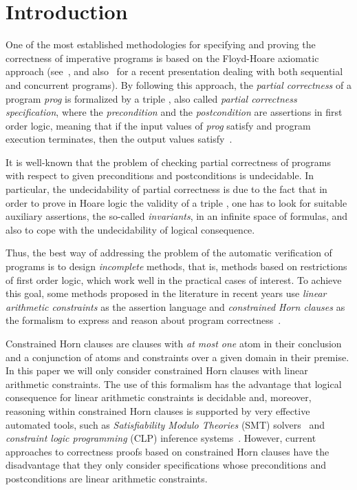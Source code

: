 \documentclass[english]{tlp}
\begin{document}
\section{Introduction}
\label{sec:intro}

One of the most established methodologies for specifying
and proving the correctness of imperative programs is based on the 
Floyd-Hoare axiomatic approach
(see~\cite{Hoa69}, and also~\cite{Ap&09} for a recent presentation dealing with 
both sequential and concurrent programs). 
By following this approach, the {\it partial correctness} of a program 
\textit{prog} is formalized by a triple
, also called {\it partial 
correctness specification}, 
where the {\it precondition}  and the
{\it postcondition}  are assertions in
first order logic, meaning that
if the input values of \textit{prog} satisfy 
and program execution terminates, then the output values satisfy~.

It is well-known that the problem of checking
partial correctness of programs with respect to given 
preconditions and postconditions
is undecidable. 
In particular, the undecidability of partial correctness is due to the fact
that in order to prove in Hoare logic the validity of a 
triple , 
one has to look for suitable auxiliary assertions, 
the so-called {\it invariants}, in an infinite space of formulas, and also
to cope with the undecidability of logical consequence.

Thus, the best way of addressing the problem of the automatic verification of
programs is to design {\it incomplete} methods, that is, methods
based on restrictions of first order logic, which work well in the practical cases of interest.
To achieve this goal, some methods proposed in the literature
in recent years use 
{\it linear arithmetic constraints} as the assertion language and {\it constrained 
Horn clauses} as the formalism to express and reason about program 
correctness~\cite{Bj&12,De&14c,Gr&12,Ja&12,Pe&98,PoR07,Ru&13}.

Constrained Horn clauses are clauses with {\it at most one} atom in their conclusion and a conjunction of atoms
and constraints over a given domain in their premise. In this paper 
we will only consider constrained Horn clauses with linear arithmetic constraints.
The use of  this formalism has the advantage that logical consequence 
for linear arithmetic constraints is decidable and, moreover, 
reasoning within constrained Horn clauses is supported by very effective
automated tools, such as {\it Satisfiability Modulo Theories} (SMT)
solvers~\cite{DeB08,MaS13,Ru&13} and
{\it constraint logic programming} (CLP) inference systems~\cite{JaM94}.
However, current approaches to correctness proofs based on constrained Horn clauses 
have the disadvantage that they only consider specifications whose preconditions and  
postconditions are linear arithmetic constraints.
\end{document}
